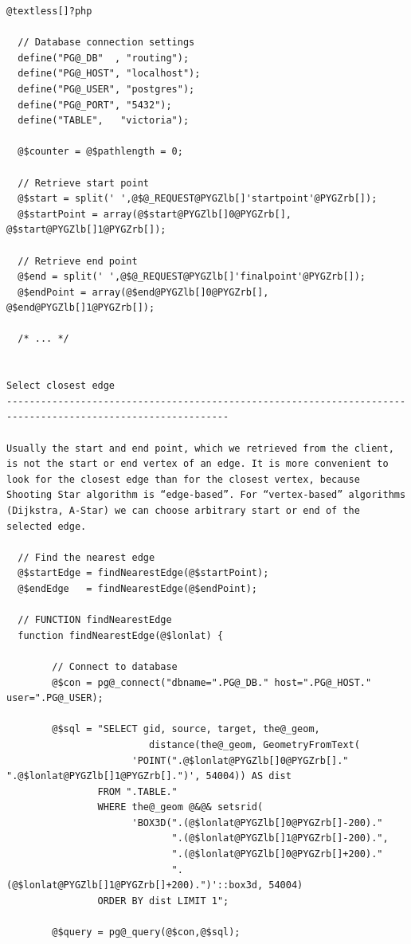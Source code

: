 \documentclass[a4paper,10pt,english]{manual}
\begin{document}
\begin{Verbatim}[commandchars=@\[\]]
@textless[]?php

  // Database connection settings
  define("PG@_DB"  , "routing");
  define("PG@_HOST", "localhost");
  define("PG@_USER", "postgres");
  define("PG@_PORT", "5432");
  define("TABLE",   "victoria");

  @$counter = @$pathlength = 0;

  // Retrieve start point
  @$start = split(' ',@$@_REQUEST@PYGZlb[]'startpoint'@PYGZrb[]);
  @$startPoint = array(@$start@PYGZlb[]0@PYGZrb[], @$start@PYGZlb[]1@PYGZrb[]);

  // Retrieve end point
  @$end = split(' ',@$@_REQUEST@PYGZlb[]'finalpoint'@PYGZrb[]);
  @$endPoint = array(@$end@PYGZlb[]0@PYGZrb[], @$end@PYGZlb[]1@PYGZrb[]);

  /* ... */


Select closest edge
-------------------------------------------------------------------------------------------------------------

Usually the start and end point, which we retrieved from the client, is not the start or end vertex of an edge. It is more convenient to look for the closest edge than for the closest vertex, because Shooting Star algorithm is “edge-based”. For “vertex-based” algorithms (Dijkstra, A-Star) we can choose arbitrary start or end of the selected edge.

  // Find the nearest edge
  @$startEdge = findNearestEdge(@$startPoint);
  @$endEdge   = findNearestEdge(@$endPoint);

  // FUNCTION findNearestEdge
  function findNearestEdge(@$lonlat) {

        // Connect to database
        @$con = pg@_connect("dbname=".PG@_DB." host=".PG@_HOST." user=".PG@_USER);

        @$sql = "SELECT gid, source, target, the@_geom,
                         distance(the@_geom, GeometryFromText(
                      'POINT(".@$lonlat@PYGZlb[]0@PYGZrb[]." ".@$lonlat@PYGZlb[]1@PYGZrb[].")', 54004)) AS dist
                FROM ".TABLE."
                WHERE the@_geom @&@& setsrid(
                      'BOX3D(".(@$lonlat@PYGZlb[]0@PYGZrb[]-200)."
                             ".(@$lonlat@PYGZlb[]1@PYGZrb[]-200).",
                             ".(@$lonlat@PYGZlb[]0@PYGZrb[]+200)."
                             ".(@$lonlat@PYGZlb[]1@PYGZrb[]+200).")'::box3d, 54004)
                ORDER BY dist LIMIT 1";

        @$query = pg@_query(@$con,@$sql);


\end{Verbatim}
\end{document}
